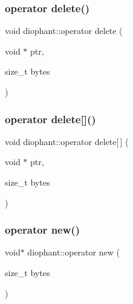 \mbox{\label{classdiophant_a72256fe11d78fb61d92311defa781e55}} 
\subsubsection{\texorpdfstring{operator delete()}{operator delete()}}
{\footnotesize\ttfamily void diophant\+::operator delete (\begin{DoxyParamCaption}\item[{void $\ast$}]{ptr,  }\item[{size\+\_\+t}]{bytes }\end{DoxyParamCaption})}

\mbox{\label{classdiophant_a7171fe9f11c2fe28f69da560c420bd25}} 
\subsubsection{\texorpdfstring{operator delete[]()}{operator delete[]()}}
{\footnotesize\ttfamily void diophant\+::operator delete\mbox{[}$\,$\mbox{]} (\begin{DoxyParamCaption}\item[{void $\ast$}]{ptr,  }\item[{size\+\_\+t}]{bytes }\end{DoxyParamCaption})}

\mbox{\label{classdiophant_a1c424e5e00210e8a0ea70f2a6ef3ae80}} 
\subsubsection{\texorpdfstring{operator new()}{operator new()}}
{\footnotesize\ttfamily void$\ast$ diophant\+::operator new (\begin{DoxyParamCaption}\item[{size\+\_\+t}]{bytes }\end{DoxyParamCaption})}

\mbox{\label{classdiophant_afe37c0efebaf060801b6298f0b0cca73}} 
